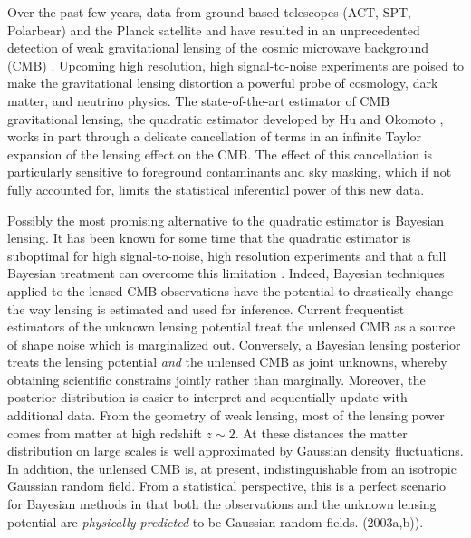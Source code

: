 \documentclass[iop,revtex4,apj,onecolumn]{emulateapj}
\begin{document}
 Over the past few years, data from ground based telescopes (ACT, SPT, Polarbear) and the Planck satellite and have resulted in an unprecedented detection of weak gravitational lensing of the cosmic microwave background (CMB) \citep{das2011detection,van2012measurement,planck2013lensing,Polarbear2014,planck2015lensing}.  Upcoming high resolution, high signal-to-noise experiments are poised to    make the gravitational lensing distortion  a  powerful probe of cosmology, dark matter, and neutrino physics. The state-of-the-art estimator of CMB gravitational lensing, the quadratic estimator developed by Hu and Okomoto \citep{hu2001mapping,hu2002mass}, works in part through a delicate cancellation of terms in an infinite Taylor expansion of the lensing effect on the CMB. The effect of this cancellation is particularly sensitive to foreground contaminants and sky masking, which  if not fully accounted for,  limits  the statistical inferential power of this new data.  

 Possibly the most promising alternative to the quadratic estimator is Bayesian lensing. It has been known for some time that the quadratic estimator is suboptimal for high signal-to-noise, high resolution experiments and that a full Bayesian treatment can overcome this limitation
 \citep{HirataSeljak1, HirataSeljak2}. Indeed, Bayesian techniques applied to the lensed CMB observations have the potential to drastically change the way lensing is estimated and used for inference.  Current frequentist estimators of the unknown lensing potential treat the unlensed CMB as a source of shape noise which is marginalized out. Conversely, a Bayesian lensing posterior treats the lensing potential {\em and} the unlensed CMB as joint unknowns, whereby obtaining scientific constrains jointly rather than marginally. Moreover, the  posterior distribution is easier to interpret and sequentially update with additional data. From the geometry of weak lensing, most of the lensing power comes from matter at high redshift $z\sim 2$. At these distances the matter distribution on large scales is well approximated by Gaussian density fluctuations. In addition, the unlensed CMB is, at present, indistinguishable from an isotropic Gaussian random field.  From a statistical perspective, this is a perfect scenario for Bayesian methods in that both the observations and the unknown lensing potential are {\em physically predicted} to be Gaussian random fields.  (2003a,b)).
 
\end{document}
